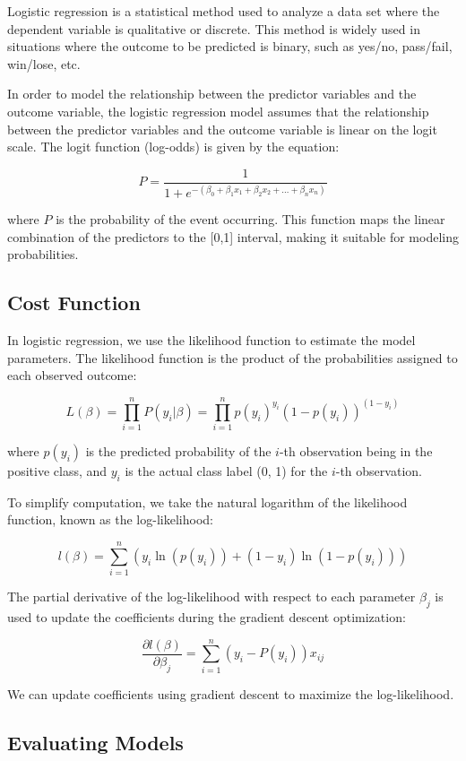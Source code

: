 \documentclass{article}
\theoremstyle{definition}
\theoremstyle{theorem}
\theoremstyle{theorem}
\theoremstyle{theorem}
\theoremstyle{theorem}
\theoremstyle{definition}
\theoremstyle{definition}
\theoremstyle{definition}
\theoremstyle{definition}
\theoremstyle{definition}
\begin{document}
Logistic regression is a statistical method used to analyze a data set where the dependent variable is qualitative or discrete. This method is widely used in situations where the outcome to be predicted is binary, such as yes/no, pass/fail, win/lose, etc.

In order to model the relationship between the predictor variables and the outcome variable, the logistic regression model assumes that the relationship between the predictor variables and the outcome variable is linear on the logit scale. The logit function (log-odds) is given by the equation:

\[
P = \frac{1}{1 + e^{-(\beta_0 + \beta_1 x_1 + \beta_2 x_2 + \ldots + \beta_n x_n)}}
\]

where \( P \) is the probability of the event occurring. This function maps the linear combination of the predictors to the [0,1] interval, making it suitable for modeling probabilities.

\subsection{Cost Function}

In logistic regression, we use the likelihood function to estimate the model parameters. The likelihood function is the product of the probabilities assigned to each observed outcome:

\[
L(\beta) = \prod_{i=1}^{n} P(y_i | \beta) = \prod_{i=1}^{n} p(y_i)^{y_i} (1 - p(y_i))^{(1 - y_i)}
\]

where \( p(y_i) \) is the predicted probability of the \( i \)-th observation being in the positive class, and \( y_i \) is the actual class label (0, 1) for the \( i \)-th observation.

To simplify computation, we take the natural logarithm of the likelihood function, known as the log-likelihood:

\[
l(\beta) = \sum_{i=1}^{n} \left( y_i \ln(p(y_i)) + (1 - y_i) \ln(1 - p(y_i)) \right)
\]

The partial derivative of the log-likelihood with respect to each parameter \( \beta_j \) is used to update the coefficients during the gradient descent optimization:

\[
\frac{\partial l(\beta)}{\partial \beta_j} = \sum_{i=1}^{n} (y_i - P(y_i)) x_{ij}
\]

We can update coefficients using gradient descent to maximize the log-likelihood.

\subsection{Evaluating Models}
\end{document}
